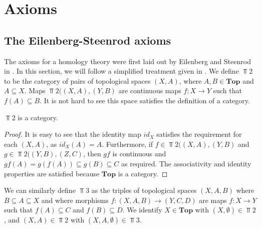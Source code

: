 \section{Axioms}\label{sec-axioms}
\subsection{The Eilenberg-Steenrod axioms}
The axioms for a homology theory were first laid out by Eilenberg and Steenrod in \cite{Eilenberg}. In this section, we will follow a simplified treatment given in \cite{Werndli}. We define $\Top{2}$ to be the category of pairs of topological spaces $(X,A)$, where $A,B\in \mathbf{Top}$ and $A\subseteq X$. Maps $\Top{2}((X,A),(Y,B)$ are continuous maps $f:X\rightarrow Y$ such that $f(A)\subseteq B$. It is not hard to see this space satisfies the definition of a category.

\begin{lemma}
$\Top{2}$ is a category.
\end{lemma}
\begin{proof}
It is easy to see that the identity map $id_X$ satisfies the requirement for each $(X,A)$, as $id_X(A)=A$. Furthermore, if $f\in \Top{2}((X,A),(Y,B)$ and $g\in \Top{2}((Y,B),(Z,C)$, then $gf$ is continuous and $gf(A)= g(f(A))\subseteq g(B)\subseteq C$ as required. The associativity and identity properties are satisfied because $\mathbf{Top}$ is a category.
\end{proof}

We can similarly define $\Top{3}$ as the triples of topological spaces $(X,A,B)$ where $B\subseteq A \subseteq X$ and where morphisms $f:(X,A,B)\rightarrow (Y,C,D)$ are maps $f:X\rightarrow Y$ such that $f(A)\subseteq C$ and $f(B)\subseteq D$. We identify $X\in \mathbf{Top}$ with $(X,\emptyset)\in \Top{2}$, and $(X,A)\in \Top{2}$ with $(X,A,\emptyset)\in \Top{3}$.

